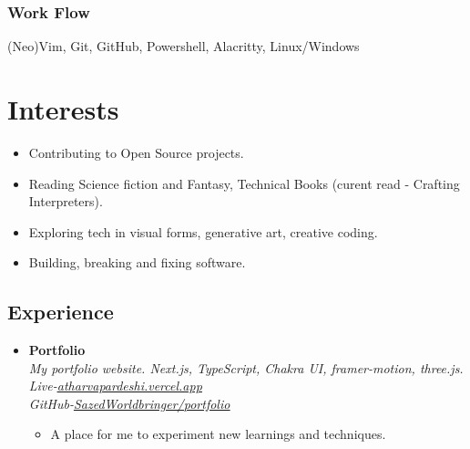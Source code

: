 \documentclass[11pt, oneside, a4paper, titlepage]{article}
\newcommand\skillsVSpace{\vspace{-0.3cm}}
\begin{document}
\begin{tcolorbox}
\begin{minipage}[t]{8cm}
\begin{tcolorbox}[grow to left by=0.6cm,colback=gray!25,colframe=white]
        \skillsVSpace
        \subsubsection{Work Flow}
        (Neo)Vim, Git, GitHub, Powershell, Alacritty, Linux/Windows

      \section*{Interests}
      \begin{itemize}
        \item{Contributing to Open Source projects.}
        \item{Reading Science fiction and Fantasy, Technical Books (curent read - Crafting Interpreters).}
        \item{Exploring tech in visual forms, generative art, creative coding.}
        \item{Building, breaking and fixing software.}
      \end{itemize}
    \end{tcolorbox}
  \end{minipage}
  \begin{minipage}[t]{11cm}
    \vspace*{-0.5cm}
    \begin{tcolorbox}[grow to right by=0.75cm,colframe=white,colback=white]
      \section*{Experience}
      \begin{itemize}
        \item
        {
          \textbf{Portfolio} \\
          \textit{My portfolio website. Next.js, TypeScript, Chakra UI, framer-motion, three.js.} \\
          \textit{Live-\href{https://atharvapardeshi.vercel.app}{\underline{atharvapardeshi.vercel.app}} \\ GitHub-\href{https://github.com/SazedWorldbringer/portfolio}{\underline{SazedWorldbringer/portfolio}}} \\
          \vspace*{-0.7cm}
          \begin{itemize}
            \item A place for me to experiment new learnings and techniques.
          \end{itemize}
        }


\end{itemize}
\end{tcolorbox}
\end{minipage}
\end{tcolorbox}
\end{document}
